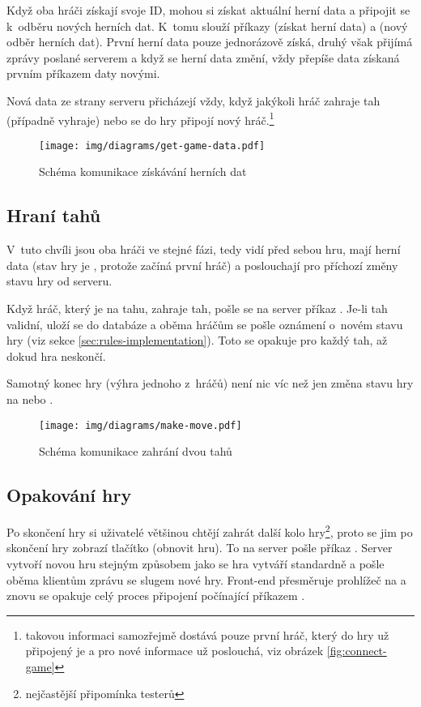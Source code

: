 
Když oba hráči získají svoje ID, mohou si získat aktuální herní data a připojit
se k~odběru nových herních dat. K~tomu slouží příkazy  (získat
herní data) a  (nový odběr herních dat). První herní
data pouze jednorázově získá, druhý však přijímá zprávy poslané serverem a když
se herní data změní, vždy přepíše data získaná prvním příkazem daty novými.

Nová data ze strany serveru přicházejí vždy, když jakýkoli hráč zahraje tah
(případně vyhraje) nebo se do hry připojí nový hráč.\footnote{takovou informaci
samozřejmě dostává pouze první hráč, který do hry už připojený je a pro nové
informace už poslouchá, viz obrázek \ref{fig:connect-game}}

\begin{figure}[H]
    \centering
    \texttt{[image: img/diagrams/get-game-data.pdf]}
    \caption{Schéma komunikace získávání herních dat}
    \label{fig:get-game-data}
\end{figure}

\subsection{Hraní tahů}

V~tuto chvíli jsou oba hráči ve stejné fázi, tedy vidí před sebou hru, mají
herní data (stav hry je , protože začíná první hráč) a
poslouchají pro příchozí změny stavu hry od serveru.

Když hráč, který je na tahu, zahraje tah, pošle se na server příkaz .
Je-li tah validní, uloží se do databáze a oběma hráčům se pošle oznámení
 o~novém stavu hry (viz sekce \ref{sec:rules-implementation}).
Toto se opakuje pro každý tah, až dokud hra neskončí.

Samotný konec hry (výhra jednoho z~hráčů) není nic víc než jen změna stavu hry
na  nebo .

\begin{figure}[H]
    \centering
    \texttt{[image: img/diagrams/make-move.pdf]}
    \caption{Schéma komunikace zahrání dvou tahů}
    \label{fig:make-move}
\end{figure}

\subsection{Opakování hry}
Po skončení hry si uživatelé většinou chtějí zahrát další kolo
hry\footnote{nejčastější připomínka testerů}, proto se jim po skončení hry
zobrazí tlačítko  (obnovit hru). To na server pošle příkaz
. Server vytvoří novou hru stejným způsobem jako se hra vytváří
standardně a pošle oběma klientům zprávu  se slugem nové hry.
Front-end přesměruje prohlížeč na  a znovu se opakuje celý
proces připojení počínající příkazem .

